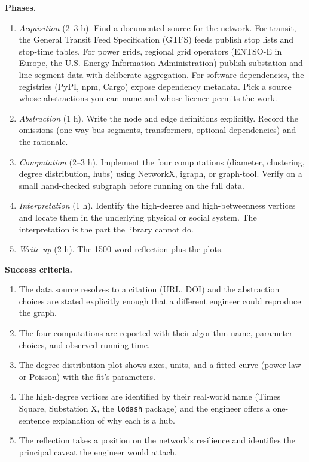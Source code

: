 \begin{project}
\textbf{Phases.}
\begin{enumerate}[leftmargin=*]
  \item \textit{Acquisition} (2--3 h). Find a documented source for
    the network. For transit, the General Transit Feed Specification
    (GTFS) feeds publish stop lists and stop-time tables. For power
    grids, regional grid operators (ENTSO-E in Europe, the U.S.
    Energy Information Administration) publish substation and
    line-segment data with deliberate aggregation. For software
    dependencies, the registries (PyPI, npm, Cargo) expose
    dependency metadata. Pick a source whose abstractions you can
    name and whose licence permits the work.
  \item \textit{Abstraction} (1 h). Write the node and edge
    definitions explicitly. Record the omissions (one-way bus
    segments, transformers, optional dependencies) and the
    rationale.
  \item \textit{Computation} (2--3 h). Implement the four
    computations (diameter, clustering, degree distribution, hubs)
    using NetworkX, igraph, or graph-tool. Verify on a small
    hand-checked subgraph before running on the full data.
  \item \textit{Interpretation} (1 h). Identify the high-degree and
    high-betweenness vertices and locate them in the underlying
    physical or social system. The interpretation is the part the
    library cannot do.
  \item \textit{Write-up} (2 h). The 1500-word reflection plus the
    plots.
\end{enumerate}

\textbf{Success criteria.}
\begin{enumerate}[leftmargin=*]
  \item The data source resolves to a citation (URL, DOI) and the
    abstraction choices are stated explicitly enough that a
    different engineer could reproduce the graph.
  \item The four computations are reported with their algorithm
    name, parameter choices, and observed running time.
  \item The degree distribution plot shows axes, units, and a
    fitted curve (power-law or Poisson) with the fit's parameters.
  \item The high-degree vertices are identified by their real-world
    name (Times Square, Substation X, the \texttt{lodash} package)
    and the engineer offers a one-sentence explanation of why each
    is a hub.
  \item The reflection takes a position on the network's resilience
    and identifies the principal caveat the engineer would attach.
\end{enumerate}


\end{project}

